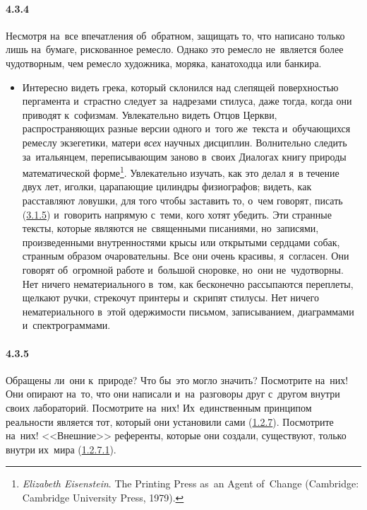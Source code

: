 \paragraph{4.3.4}\hypertarget{par:4.3.4}{} Несмотря на~все впечатления об~обратном, защищать то, что написано только лишь на~бумаге, рискованное ремесло. Однако это ремесло не~является более чудотворным, чем ремесло художника, моряка, канатоходца или банкира.
	\begin{itemize}
	\item 
	Интересно видеть грека, который склонился над слепящей поверхностью пергамента и~страстно следует за~надрезами стилуса, даже тогда, когда они приводят к~софизмам. Увлекательно видеть Отцов Церкви, распространяющих разные версии одного и~того же~текста и~обучающихся ремеслу экзегетики, матери {\itshape всех} научных дисциплин. Волнительно следить за~итальянцем, переписывающим заново в~своих Диалогах книгу природы математической форме\footnote{{\itshape Elizabeth Eisenstein}. The Printing Press as~an Agent of~Change (Cam­bridge: Cambridge University Press, 1979).}. Увлекательно изучать, как это делал я~в течение двух лет, иголки, царапающие цилиндры физиографов; видеть, как расставляют ловушки, для того чтобы заставить то, о~чем говорят, писать (\hyperlink{par:3.1.5}{3.1.5}) и~говорить напрямую с~теми, кого хотят убедить. Эти странные тексты, которые являются не~священными писаниями, но~записями, произведенными внутренностями крысы или открытыми сердцами собак, странным образом очаровательны. Все они очень красивы, я~согласен. Они говорят об~огромной работе и~большой сноровке, но~они не~чудотворны. Нет ничего нематериального в~том, как бесконечно рассыпаются переплеты, щелкают ручки, стрекочут принтеры и~скрипят стилусы. Нет ничего нематериального в~этой одержимости письмом, записыванием, диаграммами и~спектрограммами.
	\end{itemize}	

\paragraph{4.3.5}\hypertarget{par:4.3.5}{} Обращены ли~они к~природе? Что бы~это могло значить? Посмотрите на~них! Они опирают на~то, что они написали и~на~разговоры друг с~другом внутри своих лабораторий. Посмотрите на~них! Их~единственным принципом реальности является тот, который они установили сами (\hyperlink{par:1.2.7}{1.2.7}). Посмотрите на~них! <<Внешние>> референты, которые они создали, существуют, только внутри их~мира (\hyperlink{par:1.2.7.1}{1.2.7.1}).


